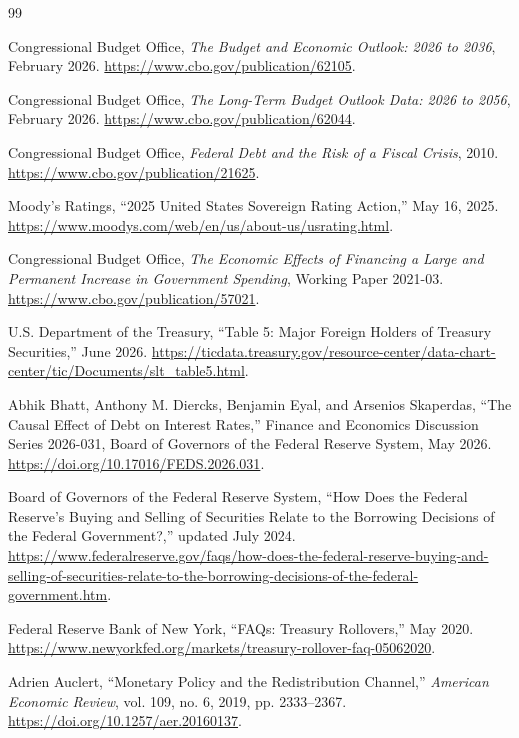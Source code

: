 \documentclass[11pt]{article}
\begin{document}
\begin{thebibliography}{99}

Congressional Budget Office, \emph{The Budget and Economic Outlook: 2026 to 2036},
February 2026.  \url{https://www.cbo.gov/publication/62105}.

Congressional Budget Office, \emph{The Long-Term Budget Outlook Data: 2026 to 2056},
February 2026.  \url{https://www.cbo.gov/publication/62044}.

Congressional Budget Office, \emph{Federal Debt and the Risk of a Fiscal Crisis}, 2010.
\url{https://www.cbo.gov/publication/21625}.

Moody's Ratings, ``2025 United States Sovereign Rating Action,'' May 16, 2025.
\url{https://www.moodys.com/web/en/us/about-us/usrating.html}.

Congressional Budget Office, \emph{The Economic Effects of Financing a Large and Permanent
Increase in Government Spending}, Working Paper 2021-03.
\url{https://www.cbo.gov/publication/57021}.

U.S. Department of the Treasury, ``Table 5: Major Foreign Holders of Treasury Securities,''
June 2026.  \url{https://ticdata.treasury.gov/resource-center/data-chart-center/tic/Documents/slt_table5.html}.

Abhik Bhatt, Anthony M. Diercks, Benjamin Eyal, and Arsenios Skaperdas, ``The Causal Effect
of Debt on Interest Rates,'' Finance and Economics Discussion Series 2026-031, Board of
Governors of the Federal Reserve System, May 2026.
\url{https://doi.org/10.17016/FEDS.2026.031}.

Board of Governors of the Federal Reserve System, ``How Does the Federal Reserve's Buying
and Selling of Securities Relate to the Borrowing Decisions of the Federal Government?,''
updated July 2024.
\url{https://www.federalreserve.gov/faqs/how-does-the-federal-reserve-buying-and-selling-of-securities-relate-to-the-borrowing-decisions-of-the-federal-government.htm}.

Federal Reserve Bank of New York, ``FAQs: Treasury Rollovers,'' May 2020.
\url{https://www.newyorkfed.org/markets/treasury-rollover-faq-05062020}.

Adrien Auclert, ``Monetary Policy and the Redistribution Channel,'' \emph{American Economic
Review}, vol. 109, no. 6, 2019, pp. 2333--2367.
\url{https://doi.org/10.1257/aer.20160137}.


\end{thebibliography}
\end{document}
